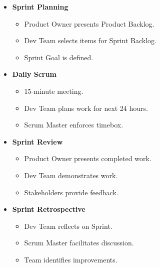 \documentclass[10pt]{article}
\begin{document}
\begin{multicols}{5}
\begin{block}
    \begin{itemize}
        \item \textbf{Sprint Planning}
        \begin{itemize}
            \item Product Owner presents Product Backlog.
            \item Dev Team selects items for Sprint Backlog.
            \item Sprint Goal is defined.
        \end{itemize}
        \item \textbf{Daily Scrum}
        \begin{itemize}
            \item 15-minute meeting.
            \item Dev Team plans work for next 24 hours.
            \item Scrum Master enforces timebox.
        \end{itemize}
        \item \textbf{Sprint Review}
        \begin{itemize}
            \item Product Owner presents completed work.
            \item Dev Team demonstrates work.
            \item Stakeholders provide feedback.
        \end{itemize}
        \item \textbf{Sprint Retrospective}
        \begin{itemize}
            \item Dev Team reflects on Sprint.
            \item Scrum Master facilitates discussion.
            \item Team identifies improvements.
        \end{itemize}
    \end{itemize}    
\end{block}


\end{multicols}
\end{document}
